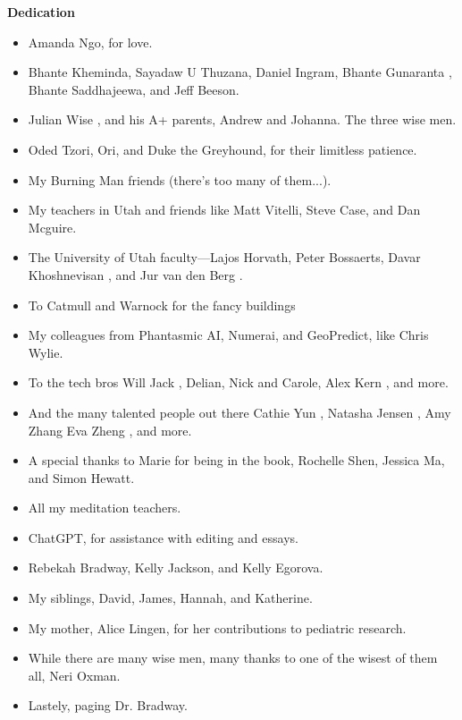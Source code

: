 \begin{titlepage}
    \centering
    {\Huge \bfseries Dedication}\par
    \vspace{2cm}
    \begin{itemize}
        \item Amanda Ngo, for love. \cite{gafori} \cite{bradway} \cite{green}
        \item Bhante Kheminda, Sayadaw U Thuzana, Daniel Ingram, Bhante Gunaranta \cite{guna} \cite{bhavana}, Bhante Saddhajeewa, and Jeff Beeson.
        \item Julian Wise \cite{yale}, and his A+ parents, Andrew and Johanna. The three wise men.
        \item Oded Tzori, Ori, and Duke the Greyhound, for their limitless patience.
        \item My Burning Man friends (there's too many of them...).
        \item My teachers in Utah and friends like Matt Vitelli, Steve Case, and Dan Mcguire.
        \item The University of Utah faculty—Lajos Horvath, Peter Bossaerts, Davar Khoshnevisan \cite{davar}, and Jur van den Berg \cite{utah}.
        \item To Catmull and Warnock for the fancy buildings \cite{utah}
        \item My colleagues from Phantasmic AI, Numerai, and GeoPredict, like Chris Wylie.
        \item To the tech bros Will Jack \cite{mit}, Delian, Nick and Carole, Alex Kern \cite{berkeley}, and more.
        \item And the many talented people out there Cathie Yun \cite{mit}, Natasha Jensen \cite{mit}, Amy Zhang \cite{mit} Eva Zheng \cite{berkeley}, and more.
        \item A special thanks to Marie for being in the book, Rochelle Shen, Jessica Ma, and Simon Hewatt.
        \item All my meditation teachers.
        \item ChatGPT, for assistance with editing and essays.
        \item Rebekah Bradway, Kelly Jackson, and Kelly Egorova.
        \item My siblings, David, James, Hannah, and Katherine.
        \item My mother, Alice Lingen, for her contributions to pediatric research.
        \item While there are many wise men, many thanks to one of the wisest of them all, Neri Oxman.
        \item Lastely, paging Dr. Bradway.
    \end{itemize}
    \vfill
\end{titlepage}
